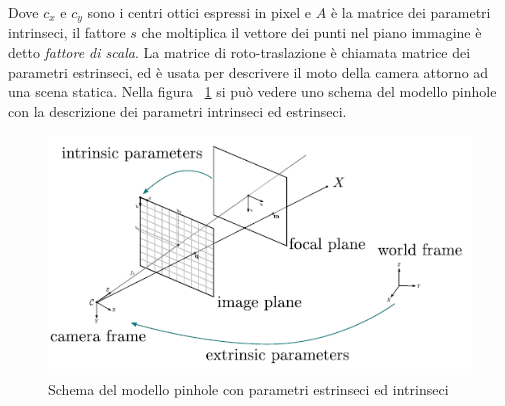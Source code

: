 Dove $c_x$ e $c_y$ sono i centri ottici espressi in pixel e $A$ è la matrice dei parametri intrinseci, il fattore $s$ che moltiplica il vettore dei punti nel piano immagine è detto \emph{fattore di scala}. La matrice di roto-traslazione è chiamata matrice dei parametri estrinseci, ed è usata per descrivere il moto della camera attorno ad una scena statica. Nella figura ~\ref{fig:modello_pin} si può vedere uno schema del modello pinhole con la descrizione dei parametri intrinseci ed estrinseci.
\begin{figure}[H]
   \centering
   \includegraphics[width=0.7\columnwidth]{pinholeCamera.png} 
   \caption{Schema del modello pinhole con parametri estrinseci ed intrinseci}
   \label{fig:modello_pin} 
\end{figure}



